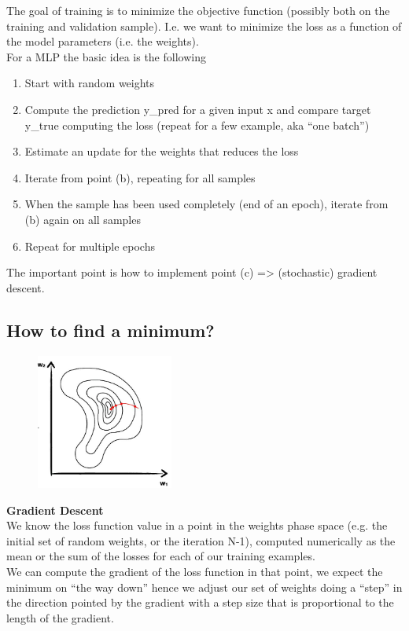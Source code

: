 The goal of training is to minimize the objective
function (possibly both on the training and validation
sample). I.e. we want to minimize the loss as a function of the model parameters (i.e. the weights).\\
For a MLP the basic idea is the following


\begin{enumerate}
	\item Start with random weights
	\item Compute the prediction y\_pred for a given input x and compare target y\_true computing the loss (repeat for a few example, aka “one batch”)
	\item Estimate an update for the weights that reduces the loss
	\item Iterate from point (b), repeating for all samples
	\item When the sample has been used completely (end of an epoch), iterate from (b) again on all samples
	\item Repeat for multiple epochs
\end{enumerate}

The important point is how to implement point (c) => (stochastic) gradient descent.

\subsection{How to find a minimum?}


\begin{figure}
	\includegraphics[width=0.4\textwidth]{figure_ml/find_minimum.png}
\end{figure} 

\textbf{Gradient Descent}\\
We know the loss function value in a point in the weights phase space (e.g. the initial set of random weights, or the iteration
N-1), computed numerically as the mean or the sum of the losses for each of our training examples.\\
We can compute the gradient of the loss function in that point, we expect the minimum on “the way down” hence we adjust our set of weights doing a “step” in the direction pointed by the gradient with a step size that is proportional to the length
of the gradient.\\

